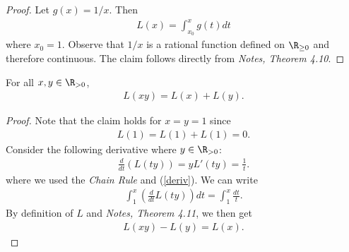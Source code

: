 \documentclass{article}
\begin{document}
\begin{proof}
   Let $g(x) = 1/x$. Then 
   \begin{align*}
      L(x) = \int_{x_0}^x g(t) dt
   \end{align*}
   where $x_0=1$. Observe that $1/x$ is a rational function defined on $\R_{\geq 0}$
   and therefore continuous. The claim follows directly from \emph{Notes, Theorem 4.10}.
\end{proof}

\begin{claim*}
   For all $x,y\in\R_{>0}$,
   \begin{align*}
      L(xy) = L(x) + L(y).
   \end{align*}
\end{claim*}

\begin{proof}
   Note that the claim holds for $x=y=1$ since 
   \begin{align*}
      L(1) = L(1) + L(1) = 0.
   \end{align*}
   Consider the following derivative where $y\in\R_{>0}$:
   \begin{align*}
      \frac{d}{dt}\left(L(ty)\right) = yL'(ty) = \frac{1}{t}.
   \end{align*}
   where we used the \emph{Chain Rule} and (\ref{deriv}). We can write
   \begin{align*}
      \int_1^x \left(\frac{d}{dt}L(ty)\right)dt = \int_1^x \frac{dt}{t}.
   \end{align*}
   By definition of $L$ and \emph{Notes, Theorem 4.11}, we then get
   \begin{align*}
      L(xy) - L(y) = L(x).
   \end{align*}
\end{proof}
\end{document}
